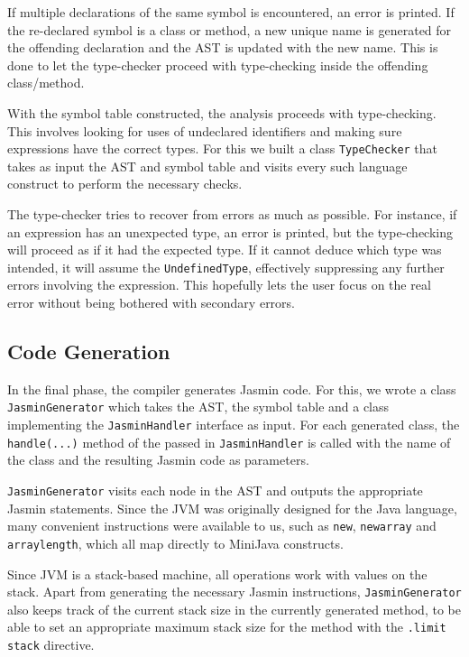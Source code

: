 \documentclass[a4paper,11pt]{article}
\begin{document}
If multiple declarations of the same symbol is encountered, an error is printed.
If the re-declared symbol is a class or method, a new unique name is generated for
the offending declaration and the AST is updated with the new name. This is done to
let the type-checker proceed with type-checking inside the offending class/method.

With the symbol table constructed, the analysis proceeds with type-checking. This
involves looking for uses of undeclared identifiers and making sure expressions
have the correct types. For this we built a class \texttt{TypeChecker} that takes as
input the AST and symbol table and visits every such language construct to perform
the necessary checks.

The type-checker tries to recover from errors as much as possible. For instance,
if an expression has an unexpected type, an error is printed, but the type-checking
will proceed as if it had the expected type. If it cannot deduce which type was
intended, it will assume the \texttt{UndefinedType}, effectively suppressing any
further errors involving the expression. This hopefully lets the user focus on the
real error without being bothered with secondary errors.

\subsection{Code Generation}
\vspace*{-0.3em}

In the final phase, the compiler generates Jasmin code. For this, we wrote a class
\texttt{JasminGenerator} which takes the AST, the symbol table and a class implementing
the \texttt{JasminHandler} interface as input. For each generated class, the
\texttt{handle(...)} method of the passed in \texttt{JasminHandler} is called with the
name of the class and the resulting Jasmin code as parameters.

\texttt{JasminGenerator} visits each node in the AST and outputs the appropriate
Jasmin statements. Since the JVM was originally designed for the Java language, many
convenient instructions were available to us, such as \texttt{new}, \texttt{newarray}
and \texttt{arraylength}, which all map directly to MiniJava constructs.

Since JVM is a stack-based machine, all operations work with values on
the stack. Apart from generating the necessary Jasmin instructions,
\texttt{JasminGenerator} also keeps track of the current stack size in the currently
generated method, to be able to set an appropriate maximum stack size for the method
with the \texttt{.limit stack} directive.
\end{document}
